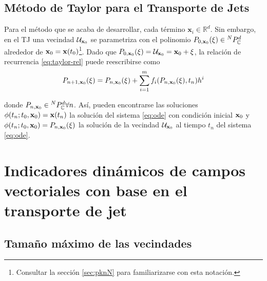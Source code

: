 \subsection{Método de Taylor para el Transporte de Jets}
Para el método que se acaba de desarrollar, cada término $\mathbf{x}_i \in \mathbb{R}^d$. Sin embargo, en el TJ una vecindad $\mathcal{U}_{\mathbf{x}_0}$ se parametriza con el polinomio $P_{0,\mathbf{x}_0}(\mathbf{\xi}) \in {^{N}P_{\mathbb{C}}^ d }$ alrededor de $\mathbf{x}_0 = \mathbf{x}(t_0)$\footnote{Consultar la sección \ref{sec:pknN} para familiarizarse con esta notación.}. Dado que $P_{0,\mathbf{x}_0}(\mathbf{\xi}) = \mathcal{U}_{\mathbf{x}_0} = \mathbf{x}_0 + \mathbf{\xi}$, la relación de recurrencia \ref{eq:taylor-rel} puede reescribirse como
\begin{equation}
P_{n+1,\mathbf{x}_0}(\xi) = P_{n,\mathbf{x}_0}(\xi) + \sum_{i=1}^m f_i(P_{n,\mathbf{x}_0}(\xi),t_n)h^i 
\label{eq:jt-rel}
\end{equation}

donde $P_{n,\mathbf{x}_0} \in {^{N}P_{\mathbb{C}}^ d } \forall n$. Así, pueden encontrarse las soluciones $\phi(t_n;t_0,\mathbf{x}_0) = \mathbf{x}(t_n)$ la solución del sistema \ref{eq:ode} con condición inicial $\mathbf{x}_0$ y $\phi(t_n;t_0,\mathbf{x}_0) = P_{n,\mathbf{x}_0}(\xi)$ la solución de la vecindad $\mathcal{U}_{\mathbf{x}_0}$ al tiempo
$t_n$ del sistema \ref{eq:ode}.


\section{Indicadores dinámicos de campos vectoriales con base en el transporte de jet}
\label{sec:ind-dinam}


\subsection{Tamaño máximo de las vecindades}
